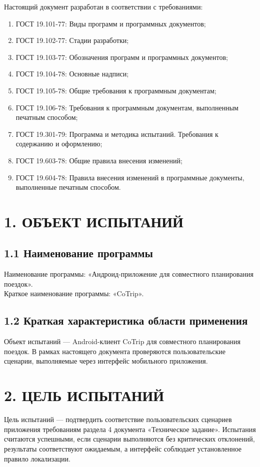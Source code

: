 \documentclass[12pt,a4paper]{article}
\begin{document}
Настоящий документ разработан в соответствии с требованиями:
\begin{enumerate}
  \item ГОСТ 19.101-77: Виды программ и программных документов;
  \item ГОСТ 19.102-77: Стадии разработки;
  \item ГОСТ 19.103-77: Обозначения программ и программных документов;
  \item ГОСТ 19.104-78: Основные надписи;
  \item ГОСТ 19.105-78: Общие требования к программным документам;
  \item ГОСТ 19.106-78: Требования к программным документам, выполненным печатным способом;
  \item ГОСТ 19.301-79: Программа и методика испытаний. Требования к содержанию и оформлению;
  \item ГОСТ 19.603-78: Общие правила внесения изменений;
  \item ГОСТ 19.604-78: Правила внесения изменений в программные документы, выполненные печатным способом.
\end{enumerate}

\clearpage
\tableofcontents
\clearpage

\section*{1. ОБЪЕКТ ИСПЫТАНИЙ}

\subsection*{1.1 Наименование программы}
Наименование программы: «Андроид-приложение для совместного планирования поездок».\\
Краткое наименование программы: «CoTrip».

\subsection*{1.2 Краткая характеристика области применения}
Объект испытаний --- Android-клиент CoTrip для совместного планирования поездок.
В рамках настоящего документа проверяются пользовательские сценарии, выполняемые через интерфейс мобильного приложения.

\clearpage
\section*{2. ЦЕЛЬ ИСПЫТАНИЙ}
Цель испытаний --- подтвердить соответствие пользовательских сценариев приложения требованиям раздела 4 документа «Техническое задание».
Испытания считаются успешными, если сценарии выполняются без критических отклонений, результаты соответствуют ожидаемым, а интерфейс соблюдает установленное правило локализации.
\end{document}

